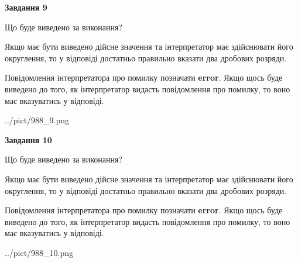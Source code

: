 \documentclass[12pt, ukrainian]{article}
\begin{document}
{\begin {Large}
{\begin {center}\textbf{Завдання 9}\end {center}}\par
Що буде виведено за виконання? \par

Якщо має бути виведено дійсне значення та інтерпретатор має здійснювати його округлення, 
то у відповіді достатньо правильно вказати два дробових розряди.

Повідомлення інтерпретатора про помилку позначати \textbf{error}.
Якщо щось буде виведено до того, як інтерпретатор видасть повідомлення про помилку, 
то воно має вказуватись у відповіді. \par

\begin{center}
	{../pict/988_9.png}
\end{center}
\newpage

{\begin {center}\textbf{Завдання 10}\end {center}}\par
Що буде виведено за виконання? \par

Якщо має бути виведено дійсне значення та інтерпретатор має здійснювати його округлення, 
то у відповіді достатньо правильно вказати два дробових розряди.

Повідомлення інтерпретатора про помилку позначати \textbf{error}.
Якщо щось буде виведено до того, як інтерпретатор видасть повідомлення про помилку, 
то воно має вказуватись у відповіді. \par

\begin{center}
	{../pict/988_10.png}
\end{center}
\newpage

\end {Large}}
\end{document}
